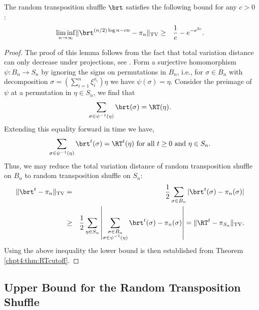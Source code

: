 \documentclass[11pt]{report}
\begin{document}
\begin{lemma}
	\label{chpt6:lem:rtlower}
	The random transposition shuffle $\brt$ satisfies the following bound for any $c>0$:
	\begin{eqnarray}
	\liminf_{n\to\infty}\lVert \brt^{(n/2)\log n -c n} - \pi_{n} \rVert_{\tiny\textnormal{TV}} & \geq & \frac{1}{e} -e^{-e^{2c}}  .\label{chpt6:eqn:brtlowerbound}
	\end{eqnarray}
\end{lemma}
\begin{proof}
	The proof of this lemma follows from the fact that total variation distance can only decrease under projections, see \cite[Lemma 7.10]{Levin2017}.
	Form a surjective homomorphism $\psi:B_{n} \to S_{n}$ by ignoring the signs on permutations in $B_{n}$, i.e., for $\sigma\in B_{n}$ with decomposition $\sigma = \left( \sum_{i=1}^{n} \xi_{i}^{x_{i}}\right) \eta$ we have $\psi(\sigma) = \eta$. Consider the preimage of $\psi$ at a permutation in $\eta \in S_{n}$, we find that
	\[\sum_{\sigma \in \psi^{-1}(\eta)} \brt(\sigma) = \RT(\eta) .\]
	Extending this equality forward in time we have, 
	\[\sum_{\sigma \in \psi^{-1}(\eta)} \brt^{t}(\sigma) = \RT^{t}(\eta) \textnormal{ for all $t\geq 0$ and $\eta \in S_{n}$} .\]
	Thus, we may reduce the total variation distance of random transposition shuffle on $B_{n}$ to random transposition shuffle on $S_{n}$:
	\begin{eqnarray*}
		\lVert \brt^{t} - \pi_{n} \rVert_{\tiny\textnormal{TV}} & = & \frac{1}{2}\sum_{\sigma \in B_{n}}|\brt^{t}(\sigma) - \pi_{n}(\sigma)| \\
		& \geq &\frac{1}{2}\sum_{\eta \in S_{n}} \left\lvert\sum_{ \substack{\sigma \in B_{n} \\ \sigma \in \psi^{-1}(\eta)}}\brt^{t}(\sigma) - \pi_{n}(\sigma)\right\rvert
		= 
		\lVert \RT^{t} - \pi_{S_{n}}\rVert_{\tiny\textnormal{TV}}.
	\end{eqnarray*}
	Using the above inequality the lower bound is then established from Theorem \ref{chpt4:thm:RTcutoff}.
\end{proof}



\subsection{Upper Bound for the Random Transposition Shuffle}
\label{chpt6:subsec:upperboundrt}
\end{document}
